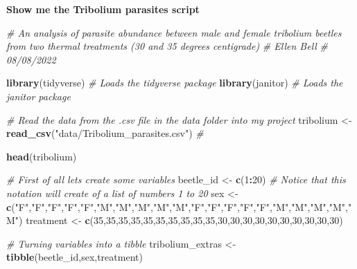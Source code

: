 \documentclass[
]{book}
\newenvironment{Shaded}{\begin{snugshade}}{\end{snugshade}}
\newcommand{\CommentTok}[1]{\textcolor[rgb]{0.56,0.35,0.01}{\textit{#1}}}
\newcommand{\DecValTok}[1]{\textcolor[rgb]{0.00,0.00,0.81}{#1}}
\newcommand{\FunctionTok}[1]{\textcolor[rgb]{0.13,0.29,0.53}{\textbf{#1}}}
\newcommand{\NormalTok}[1]{#1}
\newcommand{\OtherTok}[1]{\textcolor[rgb]{0.56,0.35,0.01}{#1}}
\newcommand{\SpecialCharTok}[1]{\textcolor[rgb]{0.81,0.36,0.00}{\textbf{#1}}}
\newcommand{\StringTok}[1]{\textcolor[rgb]{0.31,0.60,0.02}{#1}}
\begin{document}
\textbf{Show me the Tribolium parasites script}

\begin{Shaded}
\begin{Highlighting}[]
\CommentTok{\# An analysis of parasite abundance between male and female tribolium beetles from two thermal treatments (30 and 35 degrees centigrade)}
\CommentTok{\# Ellen Bell }
\CommentTok{\# 08/08/2022}

\FunctionTok{library}\NormalTok{(tidyverse) }\CommentTok{\# Loads the tidyverse package}
\FunctionTok{library}\NormalTok{(janitor) }\CommentTok{\# Loads the janitor package}

\CommentTok{\# Read the data from the .csv file in the data folder into my project}
\NormalTok{tribolium }\OtherTok{\textless{}{-}} \FunctionTok{read\_csv}\NormalTok{(}\StringTok{"data/Tribolium\_parasites.csv"}\NormalTok{) }\CommentTok{\#}

\FunctionTok{head}\NormalTok{(tribolium)}

\CommentTok{\# First of all lets create some variables}
\NormalTok{beetle\_id }\OtherTok{\textless{}{-}} \FunctionTok{c}\NormalTok{(}\DecValTok{1}\SpecialCharTok{:}\DecValTok{20}\NormalTok{) }\CommentTok{\# Notice that this notation will create of a list of numbers 1 to 20}
\NormalTok{sex }\OtherTok{\textless{}{-}} \FunctionTok{c}\NormalTok{(}\StringTok{"F"}\NormalTok{,}\StringTok{"F"}\NormalTok{,}\StringTok{"F"}\NormalTok{,}\StringTok{"F"}\NormalTok{,}\StringTok{"F"}\NormalTok{,}\StringTok{"M"}\NormalTok{,}\StringTok{"M"}\NormalTok{,}\StringTok{"M"}\NormalTok{,}\StringTok{"M"}\NormalTok{,}\StringTok{"M"}\NormalTok{,}\StringTok{"F"}\NormalTok{,}\StringTok{"F"}\NormalTok{,}\StringTok{"F"}\NormalTok{,}\StringTok{"F"}\NormalTok{,}\StringTok{"F"}\NormalTok{,}\StringTok{"M"}\NormalTok{,}\StringTok{"M"}\NormalTok{,}\StringTok{"M"}\NormalTok{,}\StringTok{"M"}\NormalTok{,}\StringTok{"M"}\NormalTok{)}
\NormalTok{treatment }\OtherTok{\textless{}{-}} \FunctionTok{c}\NormalTok{(}\DecValTok{35}\NormalTok{,}\DecValTok{35}\NormalTok{,}\DecValTok{35}\NormalTok{,}\DecValTok{35}\NormalTok{,}\DecValTok{35}\NormalTok{,}\DecValTok{35}\NormalTok{,}\DecValTok{35}\NormalTok{,}\DecValTok{35}\NormalTok{,}\DecValTok{35}\NormalTok{,}\DecValTok{35}\NormalTok{,}\DecValTok{30}\NormalTok{,}\DecValTok{30}\NormalTok{,}\DecValTok{30}\NormalTok{,}\DecValTok{30}\NormalTok{,}\DecValTok{30}\NormalTok{,}\DecValTok{30}\NormalTok{,}\DecValTok{30}\NormalTok{,}\DecValTok{30}\NormalTok{,}\DecValTok{30}\NormalTok{,}\DecValTok{30}\NormalTok{)}

\CommentTok{\# Turning variables into a tibble}
\NormalTok{tribolium\_extras }\OtherTok{\textless{}{-}} \FunctionTok{tibble}\NormalTok{(beetle\_id,sex,treatment)}


\end{Highlighting}
\end{Shaded}
\end{document}
